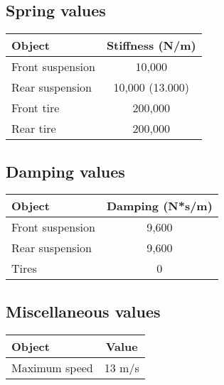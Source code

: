 \subsection{Spring values}
\begin{center}
\begin{tabular}{| l | c |}
\hline
Object & Stiffness (N/m) \\
\hline
Front suspension & 10,000 \\
Rear suspension & 10,000 (13.000) \\
Front tire & 200,000 \\
Rear tire & 200,000 \\
\hline
\end{tabular}
\end{center}

\subsection{Damping values}
\begin{center}
\begin{tabular}{| l | c |}
\hline
Object & Damping (N*s/m) \\
\hline
Front suspension & 9,600 \\
Rear suspension & 9,600 \\
Tires & 0 \\
\hline
\end{tabular}
\end{center}


\subsection{Miscellaneous values}
\begin{center}
\begin{tabular}{| l | c |}
\hline
Object & Value \\
\hline
Maximum speed & 13 m/s \\
\hline
\end{tabular}
\end{center}

